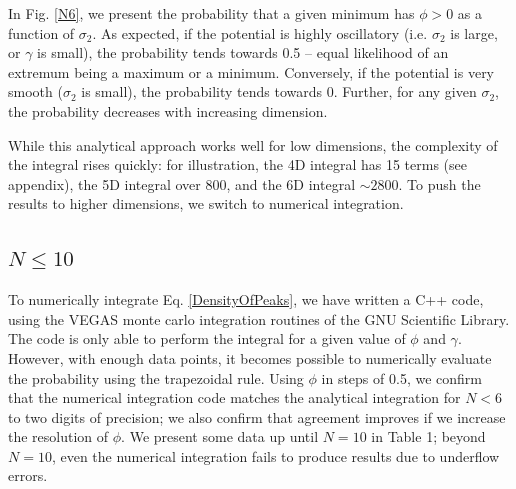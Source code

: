 \documentclass[12pt]{article}
\begin{document}
In Fig. \ref{N6}, we present the probability that a given minimum has $\phi > 0$ as a function of $\sigma_2$. As expected, if the potential is highly oscillatory (i.e. $\sigma_2$ is large, or $\gamma$ is small), the probability tends towards 0.5 -- equal likelihood of an extremum being a maximum or a minimum. Conversely, if the potential is very smooth ($\sigma_2$ is small), the probability tends towards 0. Further, for any given $\sigma_2$, the probability decreases with increasing dimension.

While this analytical approach works well for low dimensions, the complexity of the integral rises quickly: for illustration, the 4D integral has 15 terms (see appendix), the 5D integral over 800, and the 6D integral $\sim2800$. To push the results to higher dimensions, we switch to numerical integration.

\subsection{$N \leq 10$}
To numerically integrate Eq. \ref{DensityOfPeaks}, we have written a C++ code, using the VEGAS \cite{VEGAS} monte carlo integration routines of the GNU Scientific Library.\cite{GSL} The code is only able to perform the integral for a given value of $\phi$ and $\gamma$. However, with enough data points, it becomes possible to numerically evaluate the probability using the trapezoidal rule. Using $\phi$ in steps of 0.5, we confirm that the numerical integration code matches the analytical integration for $N < 6$ to two digits of precision; we also confirm that agreement improves if we increase the resolution of $\phi$. We present some data up until $N = 10$ in Table 1; beyond $N = 10$, even the numerical integration fails to produce results due to underflow errors.
\end{document}
